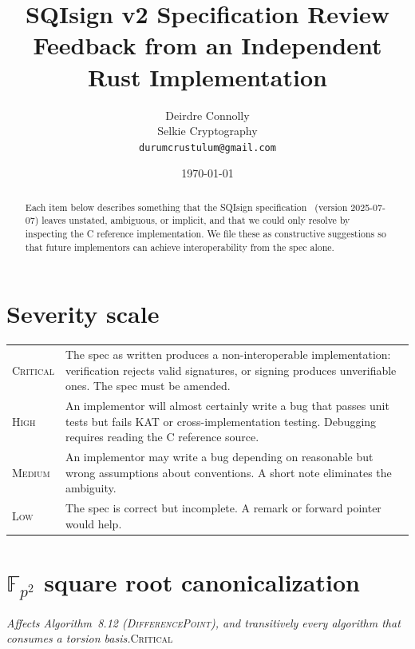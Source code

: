 \documentclass[a4paper,11pt]{article}
\title{SQIsign v2 Specification Review\\[0.3em]
  {\large Feedback from an Independent Rust Implementation}}
\author{Deirdre Connolly\\[0.2em]
  \small Selkie Cryptography\\
  \small\texttt{durumcrustulum@gmail.com}}
\date{\today\enspace{\small(living document)}}
\newcommand{\algo}[1]{Algorithm~#1}
\newcommand{\Fpii}{\mathbb{F}_{p^2}}
\newcommand{\critical}{\textsc{\color{BrickRed}Critical}}
\newcommand{\high}{\textsc{\color{BurntOrange}High}}
\newcommand{\medium}{\textsc{\color{RoyalBlue}Medium}}
\newcommand{\low}{\textsc{\color{OliveGreen}Low}}
\newcommand{\finding}[2]{\noindent\textit{#1}\hfill#2\par\smallskip}
\begin{document}
\maketitle

\begin{abstract}
Each item below describes something that the SQIsign
specification~\cite{sqisign-spec} (version 2025-07-07) leaves unstated,
ambiguous, or implicit, and that we could only resolve by inspecting the
C reference implementation.  We file these as constructive suggestions so
that future implementors can achieve interoperability from the spec
alone.
\end{abstract}

\tableofcontents

\section{Severity scale}

\smallskip
\begin{tabular}{@{}lp{}@{}}
\toprule
\critical & The spec as written produces a non-interoperable
    implementation: verification rejects valid signatures, or signing
    produces unverifiable ones.  The spec must be amended. \\[0.4em]
\high & An implementor will almost certainly write a bug that passes
    unit tests but fails KAT or cross-implementation testing.
    Debugging requires reading the C reference source. \\[0.4em]
\medium & An implementor may write a bug depending on reasonable but
    wrong assumptions about conventions.  A short note eliminates the
    ambiguity. \\[0.4em]
\low & The spec is correct but incomplete.  A remark or forward pointer
    would help. \\
\bottomrule
\end{tabular}

\section{\texorpdfstring{$\Fpii$}{Fp2} square root canonicalization}
\label{sec:sqrt}

\finding{Affects \algo{8.12} (\textsc{DifferencePoint}), and
transitively every algorithm that consumes a torsion basis.}{\critical}
\end{document}
